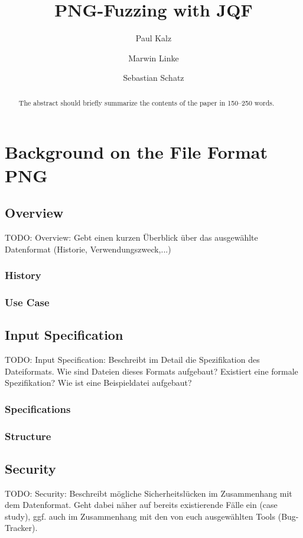 \documentclass[runningheads]{llncs}
\begin{document}
%
\title{PNG-Fuzzing with JQF}
%
%
\author{Paul Kalz \and Marwin Linke \and Sebastian Schatz}
%
\maketitle              %
%
\begin{abstract}
The abstract should briefly summarize the contents of the paper in
150--250 words.

\end{abstract}
%
%
%
\section{Background on the File Format PNG}
\subsection{Overview}
TODO: Overview: Gebt einen kurzen Überblick über das ausgewählte Datenformat (Historie, Verwendungszweck,...)
\subsubsection{History}
\subsubsection{Use Case}
\subsection{Input Specification}
TODO: Input Specification: Beschreibt im Detail die Spezifikation des Dateiformats. Wie sind Dateien dieses Formats aufgebaut? Existiert eine formale Spezifikation? Wie ist eine Beispieldatei aufgebaut?
\subsubsection{Specifications}
\subsubsection{Structure}
\subsection{Security}
TODO: Security: Beschreibt mögliche Sicherheitslücken im Zusammenhang mit dem Datenformat. Geht dabei näher auf bereits existierende Fälle ein (case study), ggf. auch im Zusammenhang mit den von euch ausgewählten Tools (Bug-Tracker).
\end{document}
